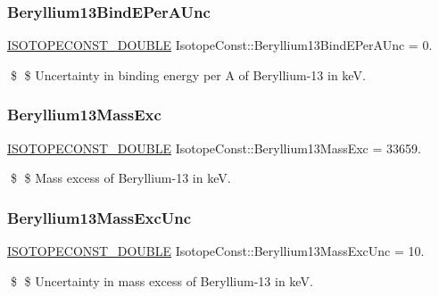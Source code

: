 \subsubsection{\texorpdfstring{Beryllium13\+Bind\+E\+Per\+A\+Unc}{Beryllium13BindEPerAUnc}}
{\footnotesize\ttfamily \mbox{\hyperlink{group___isotope_const-_macros_ga8f45a7272ce02c0b4c65c44636ed719a}{I\+S\+O\+T\+O\+P\+E\+C\+O\+N\+S\+T\+\_\+\+D\+O\+U\+B\+LE}} Isotope\+Const\+::\+Beryllium13\+Bind\+E\+Per\+A\+Unc = 0.}

\$ \$ Uncertainty in binding energy per A of Beryllium-\/13 in keV. \mbox{\label{group___isotope_const-_beryllium-_be13_ga1645a7b8cf9d142c54777e3c910918c6}} 
\subsubsection{\texorpdfstring{Beryllium13\+Mass\+Exc}{Beryllium13MassExc}}
{\footnotesize\ttfamily \mbox{\hyperlink{group___isotope_const-_macros_ga8f45a7272ce02c0b4c65c44636ed719a}{I\+S\+O\+T\+O\+P\+E\+C\+O\+N\+S\+T\+\_\+\+D\+O\+U\+B\+LE}} Isotope\+Const\+::\+Beryllium13\+Mass\+Exc = 33659.}

\$ \$ Mass excess of Beryllium-\/13 in keV. \mbox{\label{group___isotope_const-_beryllium-_be13_ga67e62a00ad58b0f4d2444a2933d57ac6}} 
\subsubsection{\texorpdfstring{Beryllium13\+Mass\+Exc\+Unc}{Beryllium13MassExcUnc}}
{\footnotesize\ttfamily \mbox{\hyperlink{group___isotope_const-_macros_ga8f45a7272ce02c0b4c65c44636ed719a}{I\+S\+O\+T\+O\+P\+E\+C\+O\+N\+S\+T\+\_\+\+D\+O\+U\+B\+LE}} Isotope\+Const\+::\+Beryllium13\+Mass\+Exc\+Unc = 10.}

\$ \$ Uncertainty in mass excess of Beryllium-\/13 in keV. \mbox{\label{group___isotope_const-_beryllium-_be13_ga572859a55ee34c149161751e0513c1d5}} 
